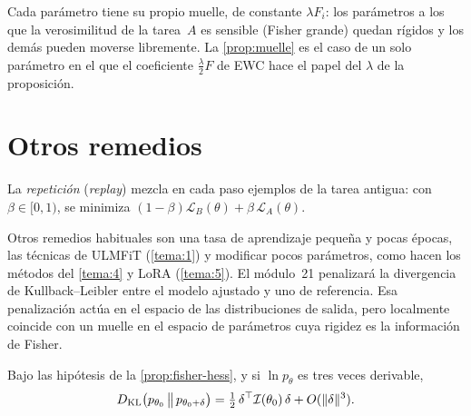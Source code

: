 Cada parámetro tiene su propio muelle, de constante $\lambda F_i$: los parámetros a los que la verosimilitud de la tarea~$A$ es sensible (Fisher grande) quedan rígidos y los demás pueden moverse libremente. La \cref{prop:muelle} es el caso de un solo parámetro en el que el coeficiente $\frac{\lambda}{2}F$ de EWC hace el papel del $\lambda$ de la proposición.

\section{Otros remedios}

\begin{definicion}[Repetición]\label{def:replay}
La \emph{repetición} (\emph{replay}) mezcla en cada paso ejemplos de la tarea antigua: con $\beta\in[0,1)$, se minimiza $(1-\beta)\mathcal{L}_B(\theta)+\beta\,\mathcal{L}_A(\theta)$.
\end{definicion}

Otros remedios habituales son una tasa de aprendizaje pequeña y pocas épocas, las técnicas de ULMFiT (\cref{tema:1}) y modificar pocos parámetros, como hacen los métodos del \cref{tema:4} y LoRA (\cref{tema:5}). El módulo~21 penalizará la divergencia de Kullback--Leibler entre el modelo ajustado y uno de referencia. Esa penalización actúa en el espacio de las distribuciones de salida, pero localmente coincide con un muelle en el espacio de parámetros cuya rigidez es la información de Fisher.

\begin{proposicion}\label{prop:kl-fisher}
Bajo las hipótesis de la \cref{prop:fisher-hess}, y si $\ln p_\theta$ es tres veces derivable,
\[
D_{\mathrm{KL}}\bigl(p_{\theta_0}\,\big\|\,p_{\theta_0+\delta}\bigr)=\tfrac12\,\delta^{\top}\mathcal{I}(\theta_0)\,\delta+O(\lVert\delta\rVert^{3}).
\]
\end{proposicion}

